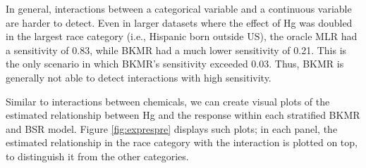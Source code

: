 \documentclass[12pt, twoside]{amherstthesis}
\begin{document}
In general, interactions between a categorical variable and a continuous variable are harder to detect. Even in larger datasets where the effect of Hg was doubled in the largest race category (i.e., Hispanic born outside US), the oracle MLR had a sensitivity of 0.83, while BKMR had a much lower sensitivity of 0.21. This is the only scenario in which BKMR's sensitivity exceeded 0.03. Thus, BKMR is generally not able to detect interactions with high sensitivity.

Similar to interactions between chemicals, we can create visual plots of the estimated relationship between Hg and the response within each stratified BKMR and BSR model. Figure \ref{fig:exprespre} displays such plots; in each panel, the estimated relationship in the race category with the interaction is plotted on top, to distinguish it from the other categories.
\end{document}
